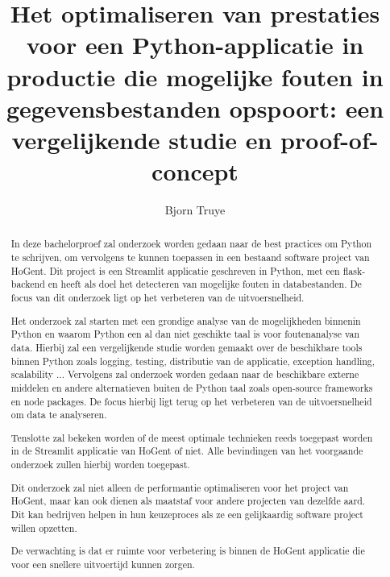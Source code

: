 \documentclass{hogent-article}
\title{Het optimaliseren van prestaties voor een Python-applicatie in productie die mogelijke fouten in gegevensbestanden opspoort: een vergelijkende studie en proof-of-concept}
\author{Bjorn Truye}
\begin{document}
\begin{abstract}
  In deze bachelorproef zal onderzoek worden gedaan naar de best practices om Python te schrijven, om vervolgens te kunnen toepassen in een bestaand software project van HoGent. Dit project is een Streamlit applicatie geschreven in Python, met een flask-backend en heeft als doel het detecteren van mogelijke fouten in databestanden. De focus van dit onderzoek ligt op het verbeteren van de uitvoersnelheid.
   
  Het onderzoek zal starten met een grondige analyse van de mogelijkheden binnenin Python en waarom Python een al dan niet geschikte taal is voor foutenanalyse van data. Hierbij zal een vergelijkende studie worden gemaakt over de beschikbare tools binnen Python zoals logging, testing, distributie van de applicatie, exception handling, scalability ...
  Vervolgens zal onderzoek worden gedaan naar de beschikbare externe middelen en andere alternatieven buiten de Python taal zoals open-source frameworks en node packages. De focus hierbij ligt terug op het verbeteren van de uitvoersnelheid om data te analyseren.
  
  Tenslotte zal bekeken worden of de meest optimale technieken reeds toegepast worden in de Streamlit applicatie van HoGent of niet. Alle bevindingen van het voorgaande onderzoek zullen hierbij worden toegepast.
  
  Dit onderzoek zal niet alleen de performantie optimaliseren voor het project van HoGent, maar kan ook dienen als maatstaf voor andere projecten van dezelfde aard. Dit kan bedrijven helpen in hun keuzeproces als ze een gelijkaardig software project willen opzetten.
  
  De verwachting is dat er ruimte voor verbetering is binnen de HoGent applicatie die voor een snellere uitvoertijd kunnen zorgen. 
\end{abstract}

\tableofcontents



\printbibliography[heading=bibintoc]
\end{document}

